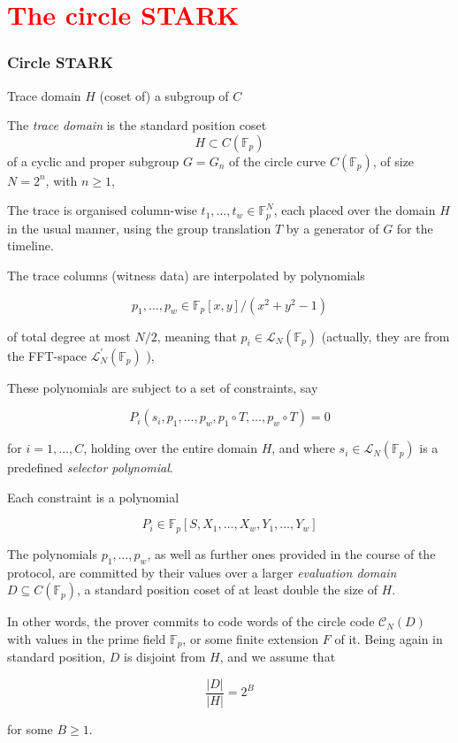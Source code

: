 \documentclass{beamer}
\begin{document}
\section{\textcolor{red}{The circle STARK}}
\begin{frame}
\frametitle{Circle STARK}
Trace domain $H$ (coset of) a subgroup of $C$
\begin{definition}
	The \emph{trace domain} is the standard position coset
$$
H \subset C\left(\mathbb{F}_p\right)
$$
of a cyclic and proper subgroup $G=G_n$ of the circle curve $C\left(\mathbb{F}_p\right)$, of size $N=2^n$, with $n \geq 1$, 

\end{definition}

The trace is organised column-wise $t_1, \ldots, t_w \in \mathbb{F}_p^N$, each placed over the domain $H$ in the usual manner, using the group translation $T$ by a generator of $G$ for the timeline. 

The trace columns (witness data) are interpolated by polynomials

$$
p_1, \ldots, p_w \in \mathbb{F}_p[x, y] /\left(x^2+y^2-1\right)
$$

of total degree at most $N / 2$, meaning that $p_i \in \mathcal{L}_N\left(\mathbb{F}_p\right)$ (actually, they are from the FFT-space $\mathcal{L}_N^{\prime}\left(\mathbb{F}_p\right)$ ), 
\end{frame}

\begin{frame}
	These polynomials are subject to a set of constraints, say

$$
P_i\left(s_i, p_1, \ldots, p_w, p_1 \circ T, \ldots, p_w \circ T\right)=0
$$

for $i=1, \ldots, C$, holding over the entire domain $H$, and where $s_i \in \mathcal{L}_N\left(\mathbb{F}_p\right)$ is a predefined \emph{selector polynomial}. 

Each constraint is a polynomial

$$
P_i \in \mathbb{F}_p\left[S, X_1, \ldots, X_w, Y_1, \ldots, Y_w\right]
$$

\end{frame}

\begin{frame}
	The polynomials $p_1, \ldots, p_w$, as well as further ones provided in the course of the protocol, are committed by their values over a larger \emph{evaluation domain} $D \subseteq C\left(\mathbb{F}_p\right)$, a standard position coset of at least double the size of $H$. 
	
	In other words, the prover commits to code words of the circle code $\mathcal{C}_N(D)$ with values in the prime field $\mathbb{F}_p$, or some finite extension $F$ of it. Being again in standard position, $D$ is disjoint from $H$, and we assume that

$$
\frac{|D|}{|H|}=2^B
$$

for some $B \geq 1$. 
\end{frame}
\end{document}
